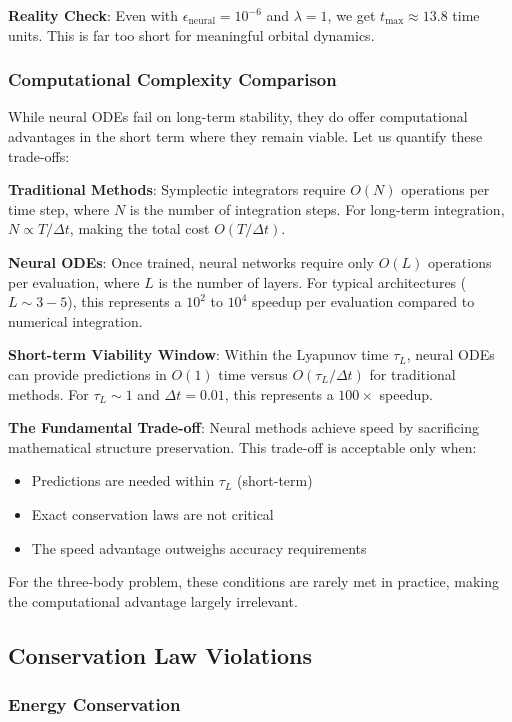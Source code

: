 \documentclass[11pt,a4paper]{article}
\begin{document}
\textbf{Reality Check}: Even with $\epsilon_{\text{neural}} = 10^{-6}$ and $\lambda = 1$, we get $t_{\text{max}} \approx 13.8$ time units. This is far too short for meaningful orbital dynamics.

\subsubsection{Computational Complexity Comparison}

While neural ODEs fail on long-term stability, they do offer computational advantages in the short term where they remain viable. Let us quantify these trade-offs:

\textbf{Traditional Methods}: Symplectic integrators require $O(N)$ operations per time step, where $N$ is the number of integration steps. For long-term integration, $N \propto T/\Delta t$, making the total cost $O(T/\Delta t)$.

\textbf{Neural ODEs}: Once trained, neural networks require only $O(L)$ operations per evaluation, where $L$ is the number of layers. For typical architectures ($L \sim 3-5$), this represents a $10^2$ to $10^4$ speedup per evaluation compared to numerical integration.

\textbf{Short-term Viability Window}: Within the Lyapunov time $\tau_L$, neural ODEs can provide predictions in $O(1)$ time versus $O(\tau_L/\Delta t)$ for traditional methods. For $\tau_L \sim 1$ and $\Delta t = 0.01$, this represents a $100\times$ speedup.

\textbf{The Fundamental Trade-off}: Neural methods achieve speed by sacrificing mathematical structure preservation. This trade-off is acceptable only when:
\begin{itemize}
    \item Predictions are needed within $\tau_L$ (short-term)
    \item Exact conservation laws are not critical
    \item The speed advantage outweighs accuracy requirements
\end{itemize}

For the three-body problem, these conditions are rarely met in practice, making the computational advantage largely irrelevant.

\subsection{Conservation Law Violations}

\subsubsection{Energy Conservation}
\end{document}
